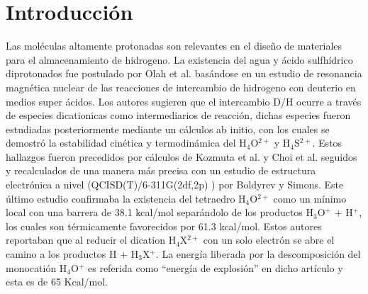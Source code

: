 \documentclass[12pt]{report}
\begin{document}
\chapter{Introducción}
Las moléculas altamente protonadas son relevantes en el diseño de materiales para el almacenamiento de hidrogeno\cite{Karkamar2009}. La existencia del agua y ácido sulfhídrico diprotonados fue postulado por Olah et al.\cite{Olah1986, Olah1988}  basándose en un estudio de resonancia magnética nuclear de las reacciones de  intercambio de hidrogeno con deuterio en medios super ácidos. Los autores sugieren que el intercambio D/H ocurre a través de especies dicationicas como intermediarios de reacción, dichas especies fueron estudiadas posteriormente mediante un cálculos ab initio, con los cuales se demostró la estabilidad cinética y termodinámica del H$_4$O$^{2+}$ y H$_4$S$^{2+}$. Estos hallazgos fueron precedidos por cálculos de Kozmuta et al.\cite{Kozmuta1982} y Choi et al.\cite{Choi1988} seguidos y recalculados de una manera más precisa con un estudio de estructura electrónica a nivel (QCISD(T)/6-311G(2df,2p) ) por Boldyrev y Simons\cite{Boldyrev1992}. Este último estudio confirmaba la existencia del tetraedro H$_4$O$^{2+}$ como un mínimo local con una barrera de 38.1 kcal/mol separándolo de los productos H$_3$O$^+$ + H$^+$, los cuales son térmicamente favorecidos por 61.3 kcal/mol. Estos autores reportaban que al reducir el dication H$_4$X$^{2+}$ con un solo electrón se abre el camino a los productos H + H$_3$X$^+$. La energía liberada por la descomposición del monocatión H$_4$O$^+$ es referida como “energía de explosión” en dicho artículo y esta es de 65 Kcal/mol.
\\
\end{document}
